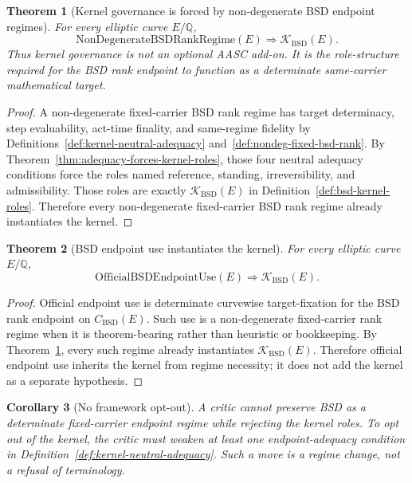 \documentclass[11pt]{article}
\newtheorem{theorem}{Theorem}[section]
\newtheorem{corollary}[theorem]{Corollary}
\newcommand{\Q}{\mathbb{Q}}
\newcommand{\BSD}{\mathrm{BSD}}
\newcommand{\Kern}{\mathcal{K}}
\newcommand{\NonDegBSD}{\mathrm{NonDegenerateBSDRankRegime}}
\begin{document}
\begin{theorem}[Kernel governance is forced by non-degenerate BSD endpoint regimes]\label{thm:kernel-governance-forced}
For every elliptic curve $E/\Q$,
\[
\NonDegBSD(E)\Rightarrow \Kern_{\BSD}(E).
\]
Thus kernel governance is not an optional AASC add-on. It is the role-structure required for the BSD rank endpoint to function as a determinate same-carrier mathematical target.
\end{theorem}

\begin{proof}
A non-degenerate fixed-carrier BSD rank regime has target determinacy, step evaluability, act-time finality, and same-regime fidelity by Definitions~\ref{def:kernel-neutral-adequacy} and~\ref{def:nondeg-fixed-bsd-rank}. By Theorem~\ref{thm:adequacy-forces-kernel-roles}, those four neutral adequacy conditions force the roles named reference, standing, irreversibility, and admissibility. Those roles are exactly $\Kern_{\BSD}(E)$ in Definition~\ref{def:bsd-kernel-roles}. Therefore every non-degenerate fixed-carrier BSD rank regime already instantiates the kernel.
\end{proof}

\begin{theorem}[BSD endpoint use instantiates the kernel]\label{thm:endpoint-instantiates-kernel}
For every elliptic curve $E/\Q$,
\[
\mathrm{OfficialBSDEndpointUse}(E) \Rightarrow \Kern_{\BSD}(E).
\]
\end{theorem}

\begin{proof}
Official endpoint use is determinate curvewise target-fixation for the BSD rank endpoint on $C_{\BSD}(E)$. Such use is a non-degenerate fixed-carrier rank regime when it is theorem-bearing rather than heuristic or bookkeeping. By Theorem~\ref{thm:kernel-governance-forced}, every such regime already instantiates $\Kern_{\BSD}(E)$. Therefore official endpoint use inherits the kernel from regime necessity; it does not add the kernel as a separate hypothesis.
\end{proof}

\begin{corollary}[No framework opt-out]\label{cor:no-framework-optout}
A critic cannot preserve BSD as a determinate fixed-carrier endpoint regime while rejecting the kernel roles. To opt out of the kernel, the critic must weaken at least one endpoint-adequacy condition in Definition~\ref{def:kernel-neutral-adequacy}. Such a move is a regime change, not a refusal of terminology.
\end{corollary}
\end{document}
